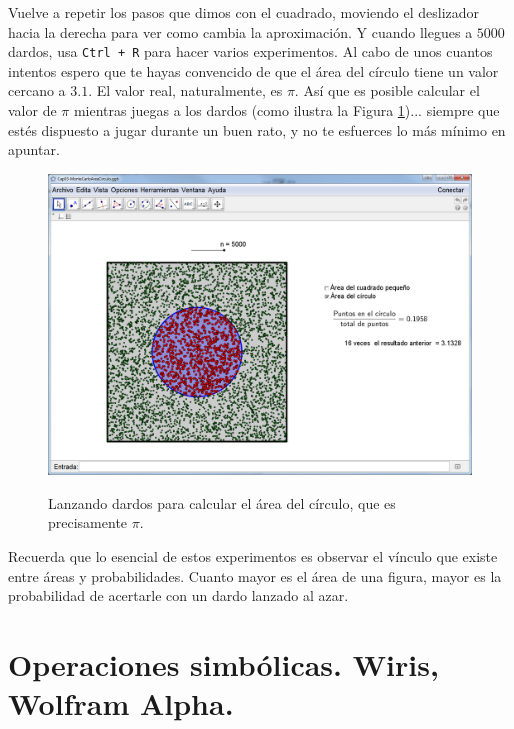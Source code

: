 \documentclass[10pt,a4paper]{article}\usepackage[]{graphicx}\usepackage[]{color}
\begin{document}
Vuelve a repetir los pasos que dimos con el cuadrado, moviendo el deslizador hacia la derecha para ver como cambia la aproximación. Y cuando llegues a $5000$ dardos, usa {\tt Ctrl + R} para hacer varios experimentos. Al cabo de unos cuantos intentos espero que te hayas convencido de que el área del círculo tiene un valor cercano a $3.1$. El valor real, naturalmente, es $\pi$. Así que es posible calcular el valor de $\pi$ mientras juegas a los dardos (como ilustra la Figura \ref{tut03:fig:MontecarloAreaCirculo03})... siempre que estés dispuesto a jugar durante un buen rato, y no te esfuerces lo más mínimo en apuntar.
\begin{figure}[h!]
    \begin{center}
    \includegraphics[width=15cm]{../fig/Tut03-45a.png}\\[3mm]
    \end{center}
  \caption{Lanzando dardos para calcular el área del círculo, que es precisamente $\pi$.}
  \label{tut03:fig:MontecarloAreaCirculo03}
\end{figure}
Recuerda que lo esencial de estos experimentos es observar el vínculo que existe entre áreas y probabilidades. Cuanto mayor es el área de una figura, mayor es la probabilidad de acertarle con un dardo lanzado al azar.


\section{Operaciones simbólicas. Wiris, Wolfram Alpha.}
\label{tut03:sec:OperacionesSimbolicas}
\end{document}
